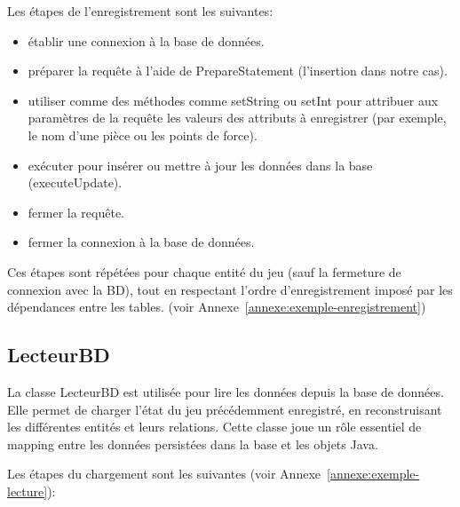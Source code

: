 \documentclass[a4paper, 12pt]{report}
\begin{document}
Les étapes de l'enregistrement sont les suivantes:

\begin{itemize}
\item établir une connexion à la base de données.
\item préparer la requête à l'aide de PrepareStatement (l'insertion dans notre cas).

\item utiliser comme des méthodes comme setString ou setInt pour attribuer aux paramètres de la requête les valeurs des attributs à enregistrer (par exemple, le nom d'une pièce ou les points de force).

\item exécuter pour insérer ou mettre à jour les données dans la base (executeUpdate).

\item fermer la requête.

\item fermer la connexion à la base de données.

\end{itemize}

Ces étapes sont répétées pour chaque entité du jeu (sauf la fermeture de connexion avec la BD), tout en respectant l’ordre d’enregistrement imposé par les dépendances entre les tables. (voir Annexe~\ref{annexe:exemple-enregistrement})

\subsection{LecteurBD}

La classe LecteurBD est utilisée pour lire les données depuis la base de données. Elle permet de charger l'état du jeu précédemment enregistré, en reconstruisant les différentes entités et leurs relations. Cette classe joue un rôle essentiel de mapping entre les données persistées dans la base et les objets Java.

Les étapes du chargement sont les suivantes (voir Annexe~\ref{annexe:exemple-lecture}): 
\end{document}
